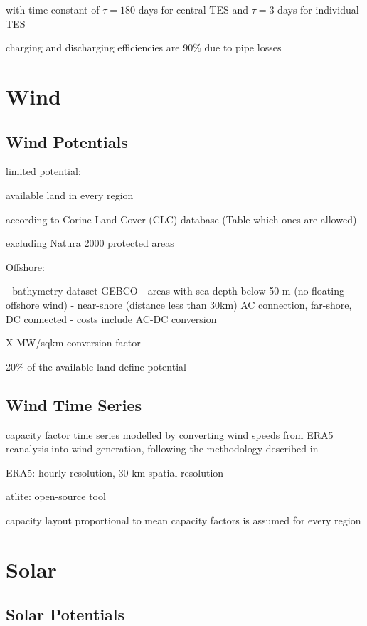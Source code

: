 with time constant of $\tau=180$ days for central TES and $\tau=3$ days for individual TES

charging and discharging efficiencies are 90\% due to pipe losses

\section{Wind}

\subsection{Wind Potentials}

limited potential:

available land in every region

according to Corine Land Cover (CLC) database (Table which ones are allowed)

excluding Natura 2000 protected areas

Offshore:

- bathymetry dataset GEBCO
- areas with sea depth below 50 m (no floating offshore wind)
- near-shore (distance less than 30km) AC connection, far-shore, DC connected
- costs include AC-DC conversion

X MW/sqkm conversion factor

20\% of the available land define potential 

\subsection{Wind Time Series}

capacity factor time series modelled by converting wind speeds from ERA5 reanalysis into wind
generation, following the methodology described in

ERA5: hourly resolution, 30 km spatial resolution

atlite: open-source tool

capacity layout proportional to mean capacity factors is assumed for every region

\section{Solar}

\subsection{Solar Potentials}

